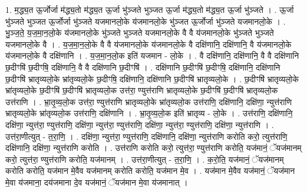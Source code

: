\documentclass[17pt]{extarticle}
\begin{document}
1. म॒द्ध्य॒त ऊ॒र्जोर्जा म॑द्ध्य॒तो म॑द्ध्य॒त ऊ॒र्जा भु॑ञ्जते भुञ्जत ऊ॒र्जा म॑द्ध्य॒तो म॑द्ध्य॒त ऊ॒र्जा भु॑ञ्जते । . ऊ॒र्जा भु॑ञ्जते भुञ्जत ऊ॒र्जोर्जा भु॑ञ्जते यजमानलो॒के य॑जमानलो॒के भु॑ञ्जत ऊ॒र्जोर्जा भु॑ञ्जते यजमानलो॒के । . भु॒ञ्ज॒ते॒ य॒ज॒मा॒न॒लो॒के य॑जमानलो॒के भु॑ञ्जते भुञ्जते यजमानलो॒के वै वै य॑जमानलो॒के भु॑ञ्जते भुञ्जते यजमानलो॒के वै । . य॒ज॒मा॒न॒लो॒के वै वै य॑जमानलो॒के य॑जमानलो॒के वै दक्षि॑णानि॒ दक्षि॑णानि॒ वै य॑जमानलो॒के य॑जमानलो॒के वै दक्षि॑णानि । . य॒ज॒मा॒न॒लो॒क इति॑ यजमान - लो॒के । . वै दक्षि॑णानि॒ दक्षि॑णानि॒ वै वै दक्षि॑णानि छ॒दीꣳषि॑ छ॒दीꣳषि॒ दक्षि॑णानि॒ वै वै दक्षि॑णानि छ॒दीꣳषि॑ । . दक्षि॑णानि छ॒दीꣳषि॑ छ॒दीꣳषि॒ दक्षि॑णानि॒ दक्षि॑णानि छ॒दीꣳषि॑ भ्रातृव्यलो॒के भ्रा॑तृव्यलो॒के छ॒दीꣳषि॒ दक्षि॑णानि॒ दक्षि॑णानि छ॒दीꣳषि॑ भ्रातृव्यलो॒के । . छ॒दीꣳषि॑ भ्रातृव्यलो॒के भ्रा॑तृव्यलो॒के छ॒दीꣳषि॑ छ॒दीꣳषि॑ भ्रातृव्यलो॒क उत्त॑रा॒ 
ण्युत्त॑राणि भ्रातृव्यलो॒के छ॒दीꣳषि॑ छ॒दीꣳषि॑ भ्रातृव्यलो॒क उत्त॑राणि । . भ्रा॒तृ॒व्य॒लो॒क उत्त॑रा॒ ण्युत्त॑राणि भ्रातृव्यलो॒के भ्रा॑तृव्यलो॒क उत्त॑राणि॒ दक्षि॑णानि॒ दक्षि॑णा॒
न्युत्त॑राणि भ्रातृव्यलो॒के भ्रा॑तृव्यलो॒क उत्त॑राणि॒ दक्षि॑णानि । . भ्रा॒तृ॒व्य॒लो॒क इति॑ भ्रातृव्य - लो॒के । . उत्त॑राणि॒ दक्षि॑णानि॒ दक्षि॑णा॒ न्युत्त॑रा॒ ण्युत्त॑राणि॒ दक्षि॑णा॒ न्युत्त॑रा॒ ण्युत्त॑राणि॒ दक्षि॑णा॒
न्युत्त॑रा॒ ण्युत्त॑राणि॒ दक्षि॑णा॒ न्युत्त॑राणि । . उत्त॑रा॒णीत्युत् - त॒रा॒णि॒ । . दक्षि॑णा॒ न्युत्त॑रा॒ ण्युत्त॑राणि॒ दक्षि॑णानि॒ दक्षि॑णा॒ न्युत्त॑राणि करोति करो॒ त्युत्त॑राणि॒ 
दक्षि॑णानि॒ दक्षि॑णा॒ न्युत्त॑राणि करोति । . उत्त॑राणि करोति करो॒ त्युत्त॑रा॒ ण्युत्त॑राणि करोति॒ यज॑मानं॒ ॅयज॑मानम् करो॒ त्युत्त॑रा॒ ण्युत्त॑राणि करोति॒ यज॑मानम् । . उत्त॑रा॒णीत्युत् - त॒रा॒णि॒ । . क॒रो॒ति॒ यज॑मानं॒ ॅयज॑मानम् करोति करोति॒ यज॑मान मे॒वैव यज॑मानम् करोति करोति॒ यज॑मान मे॒व । . यज॑मान मे॒वैव यज॑मानं॒ ॅयज॑मान मे॒वा य॑जमाना॒ दय॑जमाना दे॒व यज॑मानं॒ ॅयज॑मान मे॒वा य॑जमानात् । \newline
\end{document}

